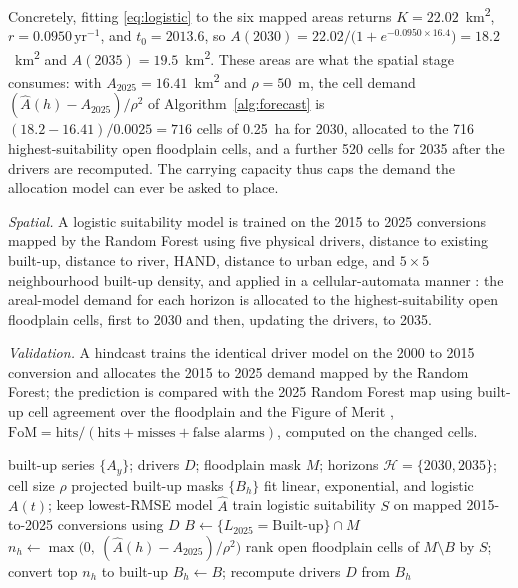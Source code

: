 \documentclass[journal]{IEEEtran}
\begin{document}
Concretely, fitting \eqref{eq:logistic} to the six mapped areas returns $K=22.02$~km\textsuperscript{2}, $r=0.0950\,\text{yr}^{-1}$, and $t_0=2013.6$, so $A(2030)=22.02/\big(1+e^{-0.0950\times16.4}\big)=18.2$~km\textsuperscript{2} and $A(2035)=19.5$~km\textsuperscript{2}. These areas are what the spatial stage consumes: with $A_{2025}=16.41$~km\textsuperscript{2} and $\rho=50$~m, the cell demand $(\hat{A}(h)-A_{2025})/\rho^{2}$ of Algorithm~\ref{alg:forecast} is $(18.2-16.41)/0.0025=716$ cells of 0.25~ha for 2030, allocated to the 716 highest-suitability open floodplain cells, and a further 520 cells for 2035 after the drivers are recomputed. The carrying capacity thus caps the demand the allocation model can ever be asked to place.

\emph{Spatial.} A logistic suitability model is trained on the 2015 to 2025 conversions mapped by the Random Forest using five physical drivers, distance to existing built-up, distance to river, HAND, distance to urban edge, and $5\times5$ neighbourhood built-up density, and applied in a cellular-automata manner \cite{yang2014markov,verburg2002clue}: the areal-model demand for each horizon is allocated to the highest-suitability open floodplain cells, first to 2030 and then, updating the drivers, to 2035.

\emph{Validation.} A hindcast trains the identical driver model on the 2000 to 2015 conversion and allocates the 2015 to 2025 demand mapped by the Random Forest; the prediction is compared with the 2025 Random Forest map using built-up cell agreement over the floodplain and the Figure of Merit \cite{pontius2008comparing}, $\text{FoM}=\text{hits}/(\text{hits}+\text{misses}+\text{false alarms})$, computed on the changed cells.

\begin{algorithm}[!t]
\caption{Cellular-automata encroachment forecasting}
\label{alg:forecast}
\begin{algorithmic}[1]
\Require built-up series $\{A_y\}$; drivers $D$; floodplain mask $M$; horizons $\mathcal{H}=\{2030,2035\}$; cell size $\rho$
\Ensure projected built-up masks $\{B_h\}$
\State fit linear, exponential, and logistic $A(t)$; keep lowest-RMSE model $\hat{A}$
\State train logistic suitability $S$ on mapped 2015-to-2025 conversions using $D$
\State $B \gets \{L_{2025}=\text{Built-up}\} \cap M$
  \State $n_h \gets \max\!\big(0,\ (\hat{A}(h)-A_{2025})/\rho^2\big)$ 
  \State rank open floodplain cells of $M\setminus B$ by $S$; convert top $n_h$ to built-up
  \State $B_h \gets B$; recompute drivers $D$ from $B_h$
\EndFor
\end{algorithmic}
\end{algorithm}
\end{document}
